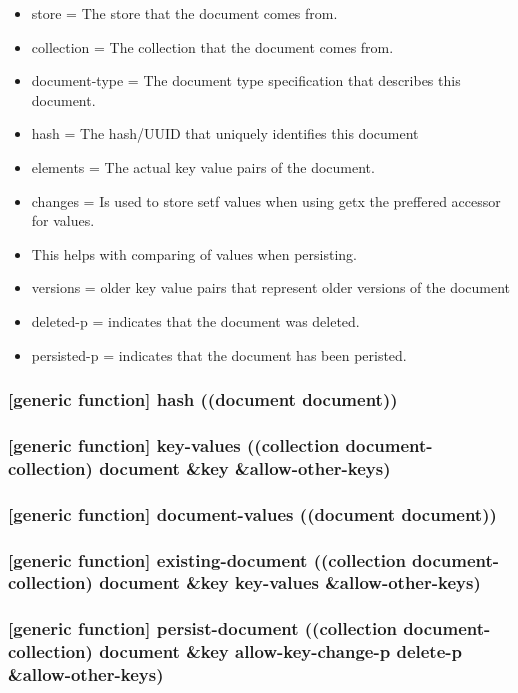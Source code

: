 \documentclass[11pt]{article}
\begin{document}
\begin{itemize}
\item store = The store that the document comes from.
\item collection = The collection that the document comes from.
\item document-type = The document type specification that describes this document.
\item hash = The hash/UUID that uniquely identifies this document
\item elements = The actual key value pairs of the document.
\item changes = Is used to store setf values when using getx the preffered accessor for values.
\item This helps with comparing of values when persisting.
\item versions = older key value pairs that represent older versions of the document
\item deleted-p = indicates that the document was deleted.
\item persisted-p = indicates that the document has been peristed.
\end{itemize}

\subsubsection{[generic function] hash ((document document))}
\label{sec:org9000e86}

\subsubsection{[generic function] key-values ((collection document-collection) document \&key \&allow-other-keys)}
\label{sec:org24e0e20}

\subsubsection{[generic function] document-values ((document document))}
\label{sec:org7daa9a6}

\subsubsection{[generic function] existing-document ((collection document-collection) document \&key key-values \&allow-other-keys)}
\label{sec:orgbd3925b}

\subsubsection{[generic function] persist-document ((collection document-collection) document \&key allow-key-change-p delete-p \&allow-other-keys)}
\label{sec:org58049fc}
\end{document}
